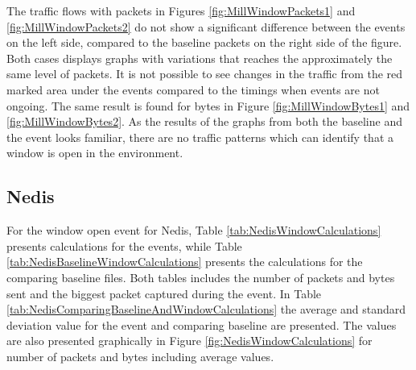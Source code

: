 The traffic flows with packets in Figures \ref{fig:MillWindowPackets1} and \ref{fig:MillWindowPackets2} do not show a significant difference between the events on the left side, compared to the baseline packets on the right side of the figure. Both cases displays graphs with variations that reaches the approximately the same level of packets. It is not possible to see changes in the traffic from the red marked area under the events compared to the timings when events are not ongoing. The same result is found for bytes in Figure \ref{fig:MillWindowBytes1} and \ref{fig:MillWindowBytes2}. As the results of the graphs from both the baseline and the event looks familiar, there are no traffic patterns which can identify that a window is open in the environment. 

\newpage
\subsection{Nedis}
For the window open event for Nedis, Table \ref{tab:NedisWindowCalculations} presents calculations for the events, while Table \ref{tab:NedisBaselineWindowCalculations} presents the calculations for the comparing baseline files. Both tables includes the number of packets and bytes sent and the biggest packet captured during the event. In Table \ref{tab:NedisComparingBaselineAndWindowCalculations} the average and standard deviation value for the event and comparing baseline are presented. The values are also presented graphically in Figure \ref{fig:NedisWindowCalculations} for number of packets and bytes including average values. 

